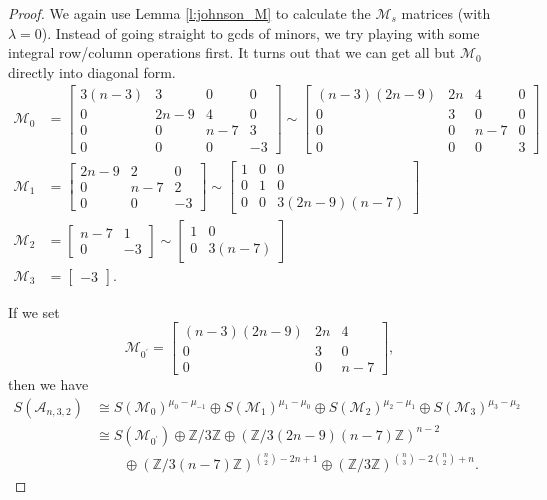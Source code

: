 \documentclass[11pt]{article}
\theoremstyle{definition}
\numberwithin{equation}{section}
\numberwithin{equation}{section}
\newcommand{\Z}[0]{\mathbb{Z}}
\newcommand{\M}{\mathcal{M}}
\newcommand{\A}{\mathcal{A}}
\begin{document}
\begin{proof} 
 We again use Lemma \ref{l:johnson_M} to calculate the $\M_s$ matrices (with $\lambda = 0$).  Instead of going straight to gcds of minors, we try playing with some integral row/column operations first.  It turns out that we can get all but $\M_{0}$ directly into diagonal form.
\begin{align*}
\M_0 &= \begin{bmatrix}
   3(n-3) & 3& 0& 0\\
    0& 2n-9& 4& 0\\
    0& 0& n-7& 3\\
    0& 0& 0& -3
\end{bmatrix} \sim \begin{bmatrix}
   (n-3)(2n-9) & 2n& 4& 0\\
    0& 3& 0& 0\\
    0& 0& n-7& 0\\
    0& 0& 0& 3
\end{bmatrix}\\
\M_1 &= \begin{bmatrix} 2n-9 & 2 & 0 \\ 0 & n-7 & 2 \\ 0 & 0 & -3 \end{bmatrix} \sim \begin{bmatrix} 1 & 0 & 0 \\ 0 & 1 & 0 \\ 0 & 0 & 3(2n-9)(n-7) \end{bmatrix}\\
 \M_2 &= \begin{bmatrix} n-7 & 1 \\ 0 & -3 \end{bmatrix} \sim \begin{bmatrix} 1 & 0 \\ 0 & 3(n-7) \end{bmatrix}\\
 \M_3 &= \begin{bmatrix} -3 \end{bmatrix}.
 \end{align*}

If we set
\[
\M_{0^{\prime}} = \begin{bmatrix}
   (n-3)(2n-9) & 2n& 4\\
    0& 3& 0\\
    0& 0& n-7
\end{bmatrix},
\] then we have
\begin{align*}
S(\A_{n,3,2}) &\cong S(\M_{0})^{\mu_{0}-\mu_{-1}} \oplus S(\M_{1})^{\mu_{1}-\mu_{0}} \oplus S(\M_{2})^{\mu_{2}-\mu_{1}} \oplus S(\M_{3})^{\mu_{3}-\mu_{2}}\\ 
&\cong S\left ( \M_{0^{\prime}} \right ) \oplus \Z/3\Z 
\oplus \left ( \Z/3(2n-9)(n-7)\Z \right )^{n-2} \\
&\qquad \oplus \left ( \Z/3(n-7)\Z \right )^{\binom{n}{2} - 2n + 1} \oplus \left ( \Z/3\Z \right )^{\binom{n}{3} - 2\binom{n}{2} + n}. 
\end{align*}


\end{proof}
\end{document}

